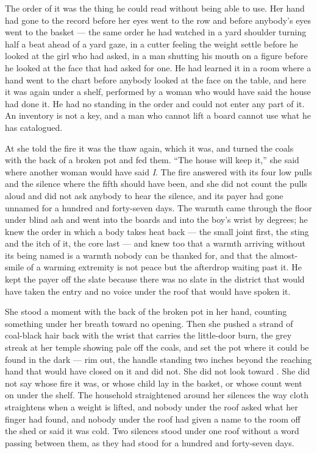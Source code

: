 The order of it was the thing he could read without being able to use. Her hand had gone to the record before her eyes went to the row and before anybody's eyes went to the basket --- the same order he had watched in a yard shoulder turning half a beat ahead of a yard gaze, in a cutter feeling the weight settle before he looked at the girl who had asked, in a man shutting his mouth on a figure before he looked at the face that had asked for one. He had learned it in a room where a hand went to the chart before anybody looked at the face on the table, and here it was again under a shelf, performed by a woman who would have said the house had done it. He had no standing in the order and could not enter any part of it. An inventory is not a key, and a man who cannot lift a board cannot use what he has catalogued.

\scenebreak

At  she told the fire it was the thaw again, which it was, and turned the coals with the back of a broken pot and fed them. “The house will keep it,” she said where another woman would have said \emph{I}. The fire answered with its four low pulls and the silence where the fifth should have been, and she did not count the pulls aloud and did not ask anybody to hear the silence, and its payer had gone unnamed for a hundred and forty-seven days. The warmth came through the floor under blind ash and went into the boards and into the boy's wrist by degrees; he knew the order in which a body takes heat back --- the small joint first, the sting and the itch of it, the core last --- and knew too that a warmth arriving without its being named is a warmth nobody can be thanked for, and that the almost-smile of a warming extremity is not peace but the afterdrop waiting past it. He kept the payer off the slate because there was no slate in the district that would have taken the entry and no voice under the roof that would have spoken it.

She stood a moment with the back of the broken pot in her hand, counting something under her breath toward no opening. Then she pushed a strand of coal-black hair back with the wrist that carries the little-door burn, the grey streak at her temple showing pale off the coals, and set the pot where it could be found in the dark --- rim out, the handle standing two inches beyond the reaching hand that would have closed on it and did not. She did not look toward . She did not say whose fire it was, or whose child lay in the basket, or whose count went on under the shelf. The household straightened around her silences the way cloth straightens when a weight is lifted, and nobody under the roof asked what her finger had found, and nobody under the roof had given a name to the room off the shed or said it was cold. Two silences stood under one roof without a word passing between them, as they had stood for a hundred and forty-seven days.

